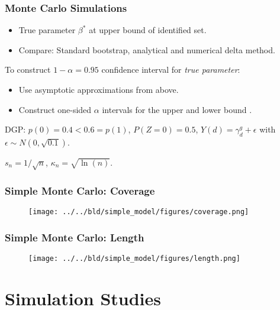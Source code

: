 \documentclass[11pt, aspectratio=169]{beamer}
\begin{document}
\begin{frame}
    \frametitle{Monte Carlo Simulations}

    \begin{itemize}
        \item True parameter $\beta^*$ at upper bound of identified set.
        \item Compare: Standard bootstrap, analytical and numerical delta method.
    \end{itemize}

    \vspace{0.5cm}

    To construct $1-\alpha = 0.95$ confidence interval for \textit{true parameter}:
    \begin{itemize}
        \item Use asymptotic approximations from above.
        \item Construct one-sided $\alpha$ intervals for the upper and lower bound \citep{imbens2004confidence}.
    \end{itemize}

    \vspace{0.5cm}

    DGP\@: $p(0) = 0.4 < 0.6 = p(1)$, $P(Z=0)=0.5$, $Y(d) = \gamma_d^g + \epsilon$ with $\epsilon\sim N(0, \sqrt{0.1})$.

    \vspace{0.5cm}
    $s_n = 1 / \sqrt{n}$, $\kappa_n = \sqrt{\ln(n)}$.

\end{frame}

\begin{frame}
    \frametitle{Simple Monte Carlo: Coverage}

    \begin{figure}
        \texttt{[image: ../../bld/simple\_model/figures/coverage.png]}
    \end{figure}

\end{frame}

\begin{frame}
    \frametitle{Simple Monte Carlo: Length}

    \begin{figure}
        \texttt{[image: ../../bld/simple\_model/figures/length.png]}
    \end{figure}

\end{frame}

\section{Simulation Studies}
\end{document}
